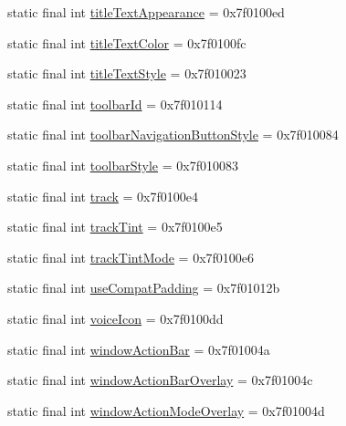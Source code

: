 \begin{CompactItemize}
\item 
static final int \hyperlink{classandroid_1_1support_1_1v7_1_1cardview_1_1_r_1_1attr_0a3dca87cbe688d54cba1db014c9fd83}{titleTextAppearance} = 0x7f0100ed
\item 
static final int \hyperlink{classandroid_1_1support_1_1v7_1_1cardview_1_1_r_1_1attr_91f8925041ee28170bede86a42b6c465}{titleTextColor} = 0x7f0100fc
\item 
static final int \hyperlink{classandroid_1_1support_1_1v7_1_1cardview_1_1_r_1_1attr_43f791720ba974afecda3efd29727a92}{titleTextStyle} = 0x7f010023
\item 
static final int \hyperlink{classandroid_1_1support_1_1v7_1_1cardview_1_1_r_1_1attr_7a7daffe1fa304b3ebaf962480d843e6}{toolbarId} = 0x7f010114
\item 
static final int \hyperlink{classandroid_1_1support_1_1v7_1_1cardview_1_1_r_1_1attr_41b2c0b38f3f509d12094b759808d024}{toolbarNavigationButtonStyle} = 0x7f010084
\item 
static final int \hyperlink{classandroid_1_1support_1_1v7_1_1cardview_1_1_r_1_1attr_d7a4aa77dc5a5a71d69ac8ba5bd5296b}{toolbarStyle} = 0x7f010083
\item 
static final int \hyperlink{classandroid_1_1support_1_1v7_1_1cardview_1_1_r_1_1attr_b3a8acb801a8ff1f358d66954b86c68d}{track} = 0x7f0100e4
\item 
static final int \hyperlink{classandroid_1_1support_1_1v7_1_1cardview_1_1_r_1_1attr_e6dbaa18c1b2c661f9db18649f62d5ea}{trackTint} = 0x7f0100e5
\item 
static final int \hyperlink{classandroid_1_1support_1_1v7_1_1cardview_1_1_r_1_1attr_e06615fa90c0f4b2a66e00cf03e19c06}{trackTintMode} = 0x7f0100e6
\item 
static final int \hyperlink{classandroid_1_1support_1_1v7_1_1cardview_1_1_r_1_1attr_43bf2ac431b43ecc85755cbb546845c0}{useCompatPadding} = 0x7f01012b
\item 
static final int \hyperlink{classandroid_1_1support_1_1v7_1_1cardview_1_1_r_1_1attr_b4a4348704f1d36757000ac7958f0155}{voiceIcon} = 0x7f0100dd
\item 
static final int \hyperlink{classandroid_1_1support_1_1v7_1_1cardview_1_1_r_1_1attr_0ab751b9d8ab53d93b47a99c71f73199}{windowActionBar} = 0x7f01004a
\item 
static final int \hyperlink{classandroid_1_1support_1_1v7_1_1cardview_1_1_r_1_1attr_e64843357226f7bf71664b63eb9fea71}{windowActionBarOverlay} = 0x7f01004c
\item 
static final int \hyperlink{classandroid_1_1support_1_1v7_1_1cardview_1_1_r_1_1attr_b92dd6cea5d28ab7e3008e34ff93f5d2}{windowActionModeOverlay} = 0x7f01004d

\end{CompactItemize}
